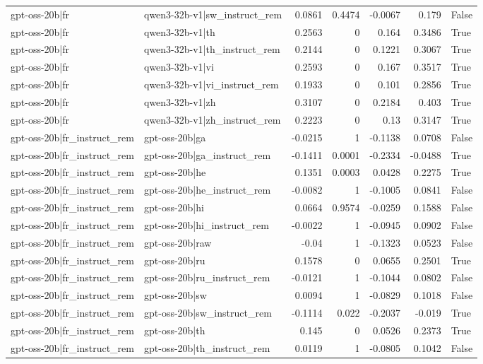 \begin{table}
\begin{tabular}{l l r r r r l}
gpt-oss-20b|fr & qwen3-32b-v1|sw_instruct_rem & 0.0861 & 0.4474 & -0.0067 & 0.179 & False \\
gpt-oss-20b|fr & qwen3-32b-v1|th & 0.2563 & 0 & 0.164 & 0.3486 & True \\
gpt-oss-20b|fr & qwen3-32b-v1|th_instruct_rem & 0.2144 & 0 & 0.1221 & 0.3067 & True \\
gpt-oss-20b|fr & qwen3-32b-v1|vi & 0.2593 & 0 & 0.167 & 0.3517 & True \\
gpt-oss-20b|fr & qwen3-32b-v1|vi_instruct_rem & 0.1933 & 0 & 0.101 & 0.2856 & True \\
gpt-oss-20b|fr & qwen3-32b-v1|zh & 0.3107 & 0 & 0.2184 & 0.403 & True \\
gpt-oss-20b|fr & qwen3-32b-v1|zh_instruct_rem & 0.2223 & 0 & 0.13 & 0.3147 & True \\
gpt-oss-20b|fr_instruct_rem & gpt-oss-20b|ga & -0.0215 & 1 & -0.1138 & 0.0708 & False \\
gpt-oss-20b|fr_instruct_rem & gpt-oss-20b|ga_instruct_rem & -0.1411 & 0.0001 & -0.2334 & -0.0488 & True \\
gpt-oss-20b|fr_instruct_rem & gpt-oss-20b|he & 0.1351 & 0.0003 & 0.0428 & 0.2275 & True \\
gpt-oss-20b|fr_instruct_rem & gpt-oss-20b|he_instruct_rem & -0.0082 & 1 & -0.1005 & 0.0841 & False \\
gpt-oss-20b|fr_instruct_rem & gpt-oss-20b|hi & 0.0664 & 0.9574 & -0.0259 & 0.1588 & False \\
gpt-oss-20b|fr_instruct_rem & gpt-oss-20b|hi_instruct_rem & -0.0022 & 1 & -0.0945 & 0.0902 & False \\
gpt-oss-20b|fr_instruct_rem & gpt-oss-20b|raw & -0.04 & 1 & -0.1323 & 0.0523 & False \\
gpt-oss-20b|fr_instruct_rem & gpt-oss-20b|ru & 0.1578 & 0 & 0.0655 & 0.2501 & True \\
gpt-oss-20b|fr_instruct_rem & gpt-oss-20b|ru_instruct_rem & -0.0121 & 1 & -0.1044 & 0.0802 & False \\
gpt-oss-20b|fr_instruct_rem & gpt-oss-20b|sw & 0.0094 & 1 & -0.0829 & 0.1018 & False \\
gpt-oss-20b|fr_instruct_rem & gpt-oss-20b|sw_instruct_rem & -0.1114 & 0.022 & -0.2037 & -0.019 & True \\
gpt-oss-20b|fr_instruct_rem & gpt-oss-20b|th & 0.145 & 0 & 0.0526 & 0.2373 & True \\
gpt-oss-20b|fr_instruct_rem & gpt-oss-20b|th_instruct_rem & 0.0119 & 1 & -0.0805 & 0.1042 & False \\

\end{tabular}
\end{table}
